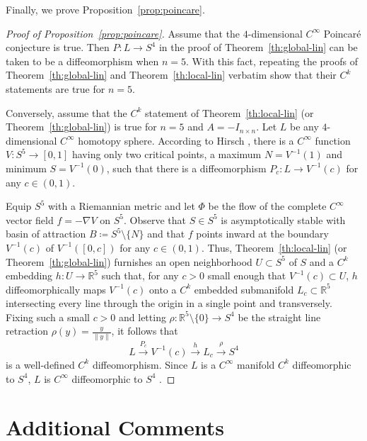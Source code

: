 \documentclass[11pt]{amsart}
\newcommand{\R}{\mathbb{R}}
\theoremstyle{definition}
\begin{document}
Finally, we prove Proposition~\ref{prop:poincare}.

\begin{proof}[Proof of Proposition~\ref{prop:poincare}]
Assume that the $4$-dimensional $C^\infty$ Poincar\'{e} conjecture is true.
Then $P\colon L\to S^{4}$ in the proof of Theorem~\ref{th:global-lin} can be taken to be a diffeomorphism when $n=5$.
With this fact, repeating the proofs of Theorem~\ref{th:global-lin} and Theorem~\ref{th:local-lin} verbatim show that their $C^k$ statements are true for $n=5$.

Conversely, assume that the $C^k$ statement of Theorem~\ref{th:local-lin} (or Theorem~\ref{th:global-lin}) is true for $n=5$ and $A=-I_{n\times n}$.
Let $L$ be any $4$-dimensional $C^\infty$ homotopy sphere.
According to Hirsch \cite[Thm~2]{hirsch1965homotopy}, there is a $C^\infty$ function $V\colon S^5\to [0,1]$ having only two critical points, a maximum $N=V^{-1}(1)$ and minimum $S=V^{-1}(0)$, such that there is a diffeomorphism $P_c\colon L\to V^{-1}(c)$ for any $c\in (0,1)$.

Equip $S^5$ with a Riemannian metric and let $\Phi$ be the flow of the complete $C^\infty$ vector field $f=-\nabla V$ on $S^5$.
Observe that $S\in S^5$ is asymptotically stable with basin of attraction $B\coloneqq S^5\setminus \{N\}$ and that $f$ points inward at the boundary $V^{-1}(c)$ of $V^{-1}([0,c])$ for any $c\in (0,1)$.
Thus, Theorem~\ref{th:local-lin} (or Theorem~\ref{th:global-lin})  furnishes an open neighborhood $U\subset S^5$ of $S$ and a $C^k$ embedding $h\colon U\to \R^5$ such that, for any $c>0$ small enough that $V^{-1}(c)\subset U$, $h$ diffeomorphically maps $V^{-1}(c)$ onto a $C^k$ embedded submanifold $L_c\subset \R^5$ intersecting every line through the origin in a single point and transversely.
Fixing such a small $c>0$ and letting $\rho\colon \R^5\setminus \{0\}\to S^{4}$ be the straight line retraction $\rho(y)=\frac{y}{\|y\|}$, it follows that
\begin{equation*}
	L\xrightarrow{P_c} V^{-1}(c) \xrightarrow{h}L_c  \xrightarrow{\rho} S^{4}
\end{equation*}
is a well-defined $C^k$ diffeomorphism. %
Since $L$ is a $C^\infty$ manifold $C^k$ diffeomorphic to $S^4$, $L$ is $C^\infty$ diffeomorphic to $S^4$ \cite[Thm~2.2.7]{hirsch1994differential}. 
\end{proof}

\section*{Additional Comments}
\end{document}
